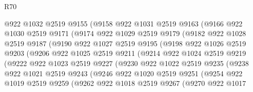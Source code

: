 \begin{lexlean}{R70}
\begin{coremodule}
              @922
              @1032
              @2519
              @9155
              (@9158
                @922
                @1031
                @2519
                @9163
                (@9166
                  @922
                  @1030
                  @2519
                  @9171
                  (@9174
                    @922
                    @1029
                    @2519
                    @9179
                    (@9182
                      @922
                      @1028
                      @2519
                      @9187
                      (@9190
                        @922
                        @1027
                        @2519
                        @9195
                        (@9198
                          @922
                          @1026
                          @2519
                          @9203
                          (@9206
                            @922
                            @1025
                            @2519
                            @9211
                            (@9214
                              @922
                              @1024
                              @2519
                              @9219
                              (@9222
                                @922
                                @1023
                                @2519
                                @9227
                                (@9230
                                  @922
                                  @1022
                                  @2519
                                  @9235
                                  (@9238
                                    @922
                                    @1021
                                    @2519
                                    @9243
                                    (@9246
                                      @922
                                      @1020
                                      @2519
                                      @9251
                                      (@9254
                                        @922
                                        @1019
                                        @2519
                                        @9259
                                        (@9262
                                          @922
                                          @1018
                                          @2519
                                          @9267
                                          (@9270
                                            @922
                                            @1017

\end{coremodule}
\end{lexlean}
